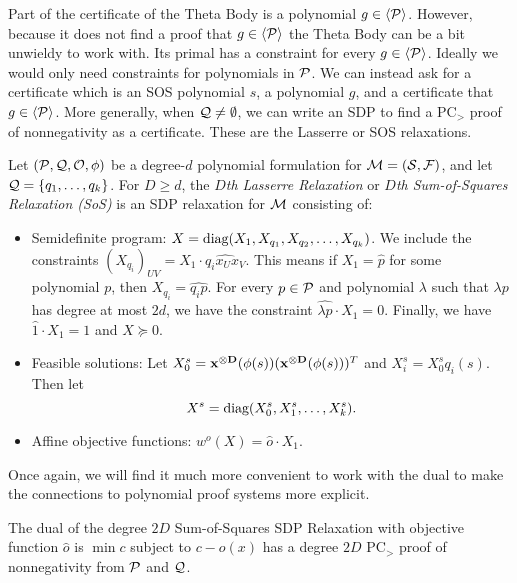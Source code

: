 Part of the certificate of the Theta Body is a polynomial $g \in \langle \mathcal P \rangle$. However, because it does not find a proof that $g \in \langle \mathcal P \rangle$ the Theta Body can be a bit unwieldy to work with. Its primal has a constraint for every $g \in \langle \mathcal P \rangle$. Ideally we would only need constraints for polynomials in $\mathcal P$. We can instead ask for a certificate which is an SOS polynomial $s$, a polynomial $g$, and a certificate that $g \in \langle \mathcal P \rangle$. More generally, when $\mathcal Q \neq \emptyset$, we can write an SDP to find a PC$_>$ proof of nonnegativity as a certificate. These are the Lasserre or SOS relaxations. 
\begin{definition}
Let $(\mathcal P, \mathcal Q, \mathcal O, \phi)$ be a degree-$d$ polynomial formulation for $\mathcal M = (\mathcal S, \mathcal F)$, and let $\mathcal Q = \{q_1, \dots, q_k\}$. For $D \geq d$, the \emph{$D$th Lasserre Relaxation} or \emph{$D$th Sum-of-Squares Relaxation (SoS)} is an SDP relaxation for $\mathcal M$ consisting of:
\begin{itemize}
\item Semidefinite program: $X = \text{diag}(X_1, X_{q_1}, X_{q_2}, \dots, X_{q_k})$. We include the constraints $(X_{q_i})_{UV} = X_1 \cdot \widehat{q_ix_Ux_V}$. This means if $X_1 = \widehat{p}$ for some polynomial $p$, then $X_{q_i} = \widehat{q_ip}$. For every $p \in \mathcal P$ and polynomial $\lambda$ such that $\lambda p$ has degree at most $2d$, we have the constraint $\widehat{\lambda p} \cdot X_1 = 0$. Finally, we have $\widehat{1} \cdot X_1 = 1$ and $X \succeq 0$.
\item Feasible solutions: Let $X_0^s = \mathbf{x^{\otimes D}}(\phi(s))(\mathbf{x^{\otimes D}}(\phi(s)))^T$ and $X_i^s = X_0^s q_i(s)$. Then let
\[X^s = \text{diag}(X_0^s, X_1^s,\dots,X_k^s).\]
\item Affine objective functions: $w^o(X) = \widehat{o} \cdot X_1$.
\end{itemize}
\end{definition}
Once again, we will find it much more convenient to work with the dual to make the connections to polynomial proof systems more explicit.
\begin{lemma}
The dual of the degree $2D$ Sum-of-Squares SDP Relaxation with objective function $\widehat{o}$ is $\min c$ subject to $c - o(x)$ has a degree $2D$ PC$_>$ proof of nonnegativity from $\mathcal P$ and $\mathcal Q$.
\end{lemma}
